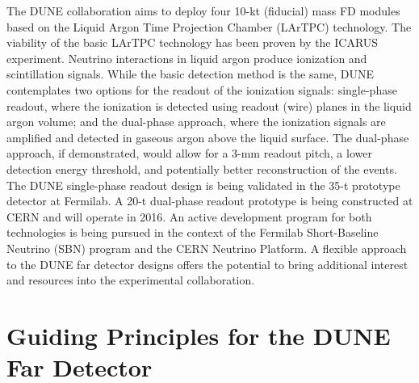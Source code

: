 The DUNE collaboration aims to deploy four 10-kt (fiducial) mass FD modules based 
on the Liquid Argon Time Projection Chamber (LArTPC) technology. The viability 
of the basic LArTPC technology has been proven by the ICARUS experiment. Neutrino 
interactions in liquid argon produce ionization and scintillation signals. While 
the basic detection method is the same, DUNE contemplates two options for the readout 
of the ionization signals: single-phase readout, where the ionization is detected 
using readout (wire) planes in the liquid argon volume; and the dual-phase approach, where 
the ionization signals are amplified and detected in gaseous argon above the liquid 
surface. The dual-phase approach, if demonstrated, would allow for a 3-mm readout 
pitch, a lower detection energy threshold, and potentially better reconstruction of 
the events. The DUNE single-phase readout design is being validated 
in the 35-t prototype detector at Fermilab. A 20-t dual-phase readout prototype is being 
constructed at CERN and will operate in 2016. An active development program for 
both technologies is being pursued in the context of the Fermilab Short-Baseline Neutrino (SBN)
program and 
the CERN Neutrino Platform. 
A flexible 
approach to the DUNE far detector designs offers the potential to bring additional 
interest and resources into the experimental collaboration. 

\section{Guiding Principles for the DUNE Far Detector}

